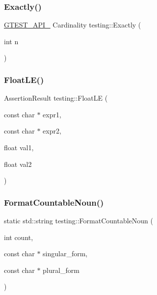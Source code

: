 \mbox{\label{namespacetesting_aa9b1b32ba9e8d3db8ac0af0fc8785c8d}} 
\subsubsection{\texorpdfstring{Exactly()}{Exactly()}}
{\footnotesize\ttfamily \mbox{\hyperlink{gtest-port_8h_aa73be6f0ba4a7456180a94904ce17790}{G\+T\+E\+S\+T\+\_\+\+A\+P\+I\+\_\+}} Cardinality testing\+::\+Exactly (\begin{DoxyParamCaption}\item[{int}]{n }\end{DoxyParamCaption})}

\mbox{\label{namespacetesting_a2c9a2a391c72a7b02ea3024586e33af0}} 
\subsubsection{\texorpdfstring{FloatLE()}{FloatLE()}}
{\footnotesize\ttfamily Assertion\+Result testing\+::\+Float\+LE (\begin{DoxyParamCaption}\item[{const char $\ast$}]{expr1,  }\item[{const char $\ast$}]{expr2,  }\item[{float}]{val1,  }\item[{float}]{val2 }\end{DoxyParamCaption})}

\mbox{\label{namespacetesting_a33e070c3e994cb75f9017fa2a044d536}} 
\subsubsection{\texorpdfstring{FormatCountableNoun()}{FormatCountableNoun()}}
{\footnotesize\ttfamily static std\+::string testing\+::\+Format\+Countable\+Noun (\begin{DoxyParamCaption}\item[{int}]{count,  }\item[{const char $\ast$}]{singular\+\_\+form,  }\item[{const char $\ast$}]{plural\+\_\+form }\end{DoxyParamCaption})\hspace{0.3cm}{\ttfamily [static]}}

